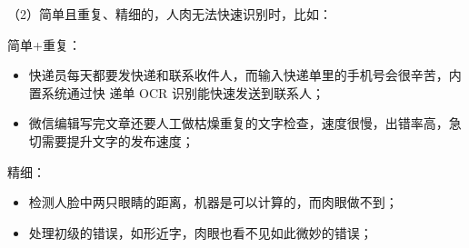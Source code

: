 \documentclass[letterpaper,11pt,english]{sphinxmanual}
\begin{document}
（2）简单且重复、精细的，人肉无法快速识别时，比如：

简单+重复：
\begin{itemize}
\item {} 
快递员每天都要发快递和联系收件人，而输入快递单里的手机号会很辛苦，内置系统通过快\sphinxhyphen{}
递单 OCR 识别能快速发送到联系人；

\item {} 
微信编辑写完文章还要人工做枯燥重复的文字检查，速度很慢，出错率高，急切需要提升文字的发布速度；

\end{itemize}

精细：
\begin{itemize}
\item {} 
检测人脸中两只眼睛的距离，机器是可以计算的，而肉眼做不到；

\item {} 
处理初级的错误，如形近字，肉眼也看不见如此微妙的错误；

\end{itemize}
\end{document}
